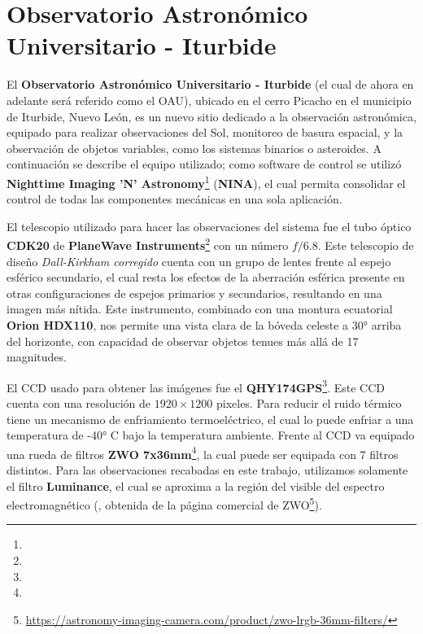 \section{Observatorio Astronómico Universitario - Iturbide} \label{muestra:observaciones:oau}

El \textbf{Observatorio Astronómico Universitario - Iturbide} (el cual de ahora
en adelante será referido como el OAU), ubicado en el cerro Picacho en el
municipio de Iturbide, Nuevo León, es un nuevo sitio dedicado a la observación
astronómica, equipado para realizar observaciones del Sol, monitoreo de basura
espacial, y la observación de objetos variables, como los sistemas binarios o
asteroides. A continuación se describe el equipo utilizado; como software de
control se utilizó \textbf{Nighttime Imaging 'N'
Astronomy}\footnote{} (\textbf{NINA}), el cual
permita consolidar el control de todas las componentes mecánicas en una sola
aplicación. 

El telescopio utilizado para hacer las observaciones del sistema fue el tubo
óptico \textbf{CDK20} de \textbf{PlaneWave
Instruments}\footnote{} con un
número $f/6.8$. Este telescopio de diseño \textit{Dall-Kirkham corregido} cuenta
con un grupo de lentes frente al espejo esférico secundario, el cual resta los
efectos de la aberración esférica presente en otras configuraciones de espejos
primarios y secundarios, resultando en una imagen más nítida. Este instrumento,
combinado con una montura ecuatorial \textbf{Orion HDX110}, nos permite una
vista clara de la bóveda celeste a \ang{30} arriba del horizonte, con capacidad
de observar objetos tenues más allá de 17 magnitudes.

El CCD usado para obtener las imágenes fue el
\textbf{QHY174GPS}\footnote{}.
Este CCD cuenta con una resolución de $1920 \times 1200$ pixeles. Para reducir
el ruido térmico tiene un mecanismo de enfriamiento termoeléctrico, el cual lo
puede enfriar a una temperatura de -\ang{40} C bajo la temperatura ambiente.
Frente al CCD va equipado una rueda de filtros \textbf{ZWO
7x36mm}\footnote{},
la cual puede ser equipada con 7 filtros distintos. Para las observaciones
recabadas en este trabajo, utilizamos solamente el filtro \textbf{Luminance}, el
cual se aproxima a la región del visible del espectro electromagnético
(, obtenida de la página comercial de
ZWO\footnote{\url{https://astronomy-imaging-camera.com/product/zwo-lrgb-36mm-filters/}}). 

